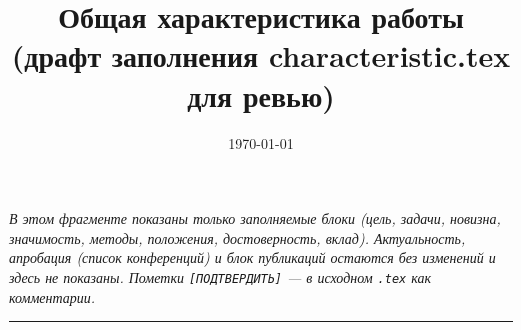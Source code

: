 \documentclass[12pt,a4paper]{article}
\title{Общая характеристика работы\\\large (драфт заполнения characteristic.tex для ревью)}
\author{}
\date{\today}
\begin{document}
\maketitle

\noindent\textit{В этом фрагменте показаны только заполняемые блоки
(цель, задачи, новизна, значимость, методы, положения, достоверность, вклад).
Актуальность, апробация (список конференций) и блок публикаций остаются без
изменений и здесь не показаны. Пометки \texttt{[ПОДТВЕРДИТЬ]} — в исходном
\texttt{.tex} как комментарии.}

\vspace{1em}
\hrule
\vspace{1em}


\end{document}
